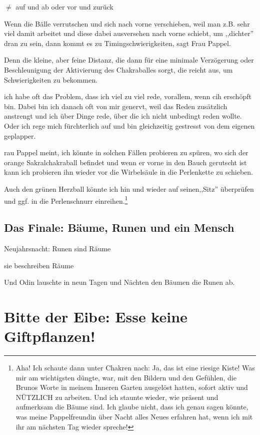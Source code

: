 \documentclass[11pt,titlepage,a5paper]{book}
\begin{document}
$\neq$ auf und ab oder vor und zurück

Wenn die Bälle verrutschen und sich nach vorne verschieben, weil man z.B. sehr viel damit arbeitet und diese dabei ausversehen nach vorne schiebt, um ,,dichter'' dran zu sein, dann kommt es zu Timingschwierigkeiten, sagt Frau Pappel.

Denn die kleine, aber feine Distanz, die dann für eine minimale Verzögerung oder Beschleunigung der Aktivierung des Chakraballes sorgt, die reicht aus, um Schwierigkeiten zu bekommen.

ich habe oft das Problem, dass ich viel zu viel rede, vorallem, wenn cih erschöpft bin. Dabei bin ich danach oft von mir genervt, weil das Reden zusätzlich anstrengt und ich über Dinge rede, über die ich nicht unbedingt reden wollte. Oder ich rege mich fürchterlich auf und bin gleichzeitig gestresst von dem eigenen geplapper.

rau Pappel meint, ich könnte in solchen Fällen probieren zu spüren, wo sich der orange Sakralchakraball befindet und wenn er vorne in den Bauch gerutscht ist kann ich probieren ihn wieder vor die Wirbelsäule in die Perlenkette zu schieben.

Auch den grünen Herzball könnte ich hin und wieder auf seinen,,Sitz'' überprüfen und ggf. in die Perlenschnurr einreihen.\footnote{Aha! Ich schaute dann unter Chakren nach: Ja, das ist eine riesige Kiste! Was mir am wichtigsten düngte, war, mit den Bildern und den Gefühlen, die Brunos Worte in meinem Inneren Garten ausgelöst hatten, sofort aktiv und NÜTZLICH zu arbeiten. Und ich staunte wieder, wie präsent und aufmerksam die Bäume sind. Ich glaube nicht, dass ich genau sagen könnte, was meine Pappelfreundin über Nacht alles Neues erfahren hat, wenn ich mit ihr am nächsten Tag wieder spreche!}



\section*{Das Finale: Bäume, Runen und ein Mensch \textarc{[\withlines]} }

Neujahrsnacht: Runen sind Räume

sie beschreiben Räume

Und Odin lauschte in neun Tagen und Nächten den Bäumen die Runen ab.



\chapter{Bitte der Eibe: Esse keine Giftpflanzen!}
\end{document}
